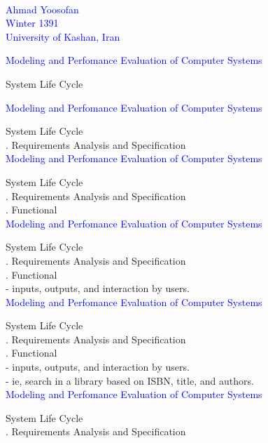 \documentclass[svgnames]{beamer}
\author{Ahmad Yoosofan}
\date{\today}
\begin{document}
\begin{frame}[c]{ }
\centering

\\[38pt]
\textcolor{blue}{Ahmad Yoosofan} \\
\textcolor{blue}{Winter 1391} \\
\textcolor{blue}{University of Kashan, Iran} \\
\end{frame}
\newpage
\textcolor{blue}{Modeling and Perfomance Evaluation of Computer Systems} \\[38pt]
\raggedright
System Life Cycle\\
\newpage

\textcolor{blue}{Modeling and Perfomance Evaluation of Computer Systems} \\[38pt]
\raggedright
\! System Life Cycle\\
. Requirements Analysis and Specification \\
\newpage
\textcolor{blue}{Modeling and Perfomance Evaluation of Computer Systems} \\[38pt]
\raggedright
\! System Life Cycle\\
. Requirements Analysis and Specification\\
. Functional \\
\newpage
\textcolor{blue}{Modeling and Perfomance Evaluation of Computer Systems} \\[38pt]
\raggedright
\! System Life Cycle\\
. Requirements Analysis and Specification\\
. Functional \\[20pt]
- inputs, outputs, and interaction by users.\\
\newpage
\textcolor{blue}{Modeling and Perfomance Evaluation of Computer Systems} \\[38pt]
\raggedright
\! System Life Cycle\\
. Requirements Analysis and Specification\\
. Functional \\[20pt]
- inputs, outputs, and interaction by users.\\
- ie, search in a library based on ISBN, title, and authors.\\
\newpage
\textcolor{blue}{Modeling and Perfomance Evaluation of Computer Systems} \\[38pt]
\raggedright
\! System Life Cycle\\
. Requirements Analysis and Specification\\
\end{document}
